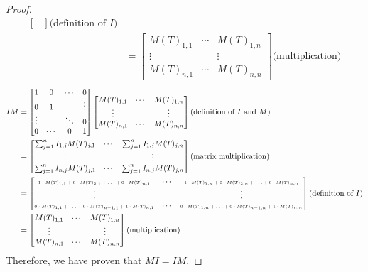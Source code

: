 \documentclass[12pt,reqno]{article}
\theoremstyle{definition}
\begin{document}
\begin{proof}
\begin{align*}
\begin{bmatrix}
        \end{bmatrix}
        \text{(definition of $I$)}\\
        &=
        \begin{bmatrix}
            M(T)_{1,1} & \cdots & M(T)_{1,n}\\
            \vdots & & \vdots\\
            M(T)_{n,1} & \cdots & M(T)_{n,n}
        \end{bmatrix}
        \text{(multiplication)}
    \end{align*}
    \begin{align*}
        IM &=
        \begin{bmatrix}
            1 & 0 & \cdots & 0\\
            0 & 1 & & \vdots \\
            \vdots &  & \ddots & 0\\
            0 & \cdots & 0 & 1
        \end{bmatrix}
        \begin{bmatrix}
            M(T)_{1,1} & \cdots & M(T)_{1,n}\\
            \vdots & & \vdots\\
            M(T)_{n,1} & \cdots & M(T)_{n,n}
        \end{bmatrix}
        \text{(definition of $I$ and $M$)}\\
        &=
        \begin{bmatrix}
            \sum_{j=1}^{n}I_{1,j}M(T)_{j,1} & \cdots & \sum_{j=1}^{n}I_{1,j}M(T)_{j,n}\\
            \vdots & & \vdots \\
            \sum_{j=1}^{n}I_{n,j}M(T)_{j,1} & \cdots & \sum_{j=1}^{n}I_{n,j}M(T)_{j,n}\\
        \end{bmatrix}
        \text{(matrix multiplication)}\\
        &=
        \begin{bmatrix}
            \text{\tiny{$1\cdot M(T)_{1,1}+0\cdot M(T)_{2,1}+\ldots+0\cdot M(T)_{n,1}$}} & \cdots & \text{\tiny{$1\cdot M(T)_{1,n}+0\cdot M(T)_{2,n}+\ldots+0\cdot M(T)_{n,n}$}}\\
            \vdots & & \vdots \\
            \text{\tiny{$0\cdot M(T)_{1,1}+\ldots+0\cdot M(T)_{n-1,1}+1\cdot M(T)_{n,1}$}} & \cdots & \text{\tiny{$0\cdot M(T)_{1,n}+\ldots+0\cdot M(T)_{n-1,n}+1\cdot M(T)_{n,n}$}}
        \end{bmatrix}
        \text{(definition of $I$)}\\
        &=
        \begin{bmatrix}
            M(T)_{1,1} & \cdots & M(T)_{1,n}\\
            \vdots & & \vdots\\
            M(T)_{n,1} & \cdots & M(T)_{n,n}
        \end{bmatrix}
        \text{(multiplication)}
    \end{align*}
    Therefore, we have proven that $MI=IM$.
\end{proof}
\end{document}
